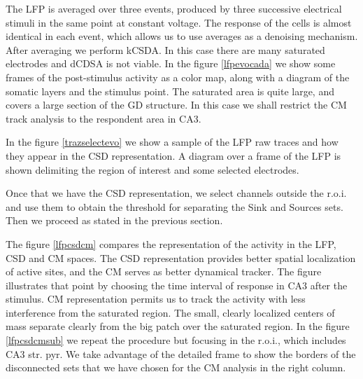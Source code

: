 \documentclass[11pt, letterpaper]{article}
\begin{document}



The LFP is averaged over three events, produced by three successive
electrical stimuli in the same point at constant voltage. The
response of the cells is almost identical in each event, which
allows us to use averages as a denoising mechanism. After averaging
we perform kCSDA. In this case there are
many saturated electrodes and dCDSA is not viable.
In the figure \ref{lfpevocada} we show some frames of the post-stimulus
activity as a color map, along
with a diagram of the somatic layers and the
stimulus point. The saturated area is quite large, and covers
a large section of the GD structure. In this case we shall
restrict the CM track analysis to the respondent area in CA3.

In the figure \ref{trazselectevo} we show a sample of the LFP
raw traces and how they appear in the CSD representation. A diagram
over a frame of the LFP is shown delimiting the region of interest and
some selected electrodes. 

Once that we have the CSD representation, we select channels outside
the r.o.i. and use them to obtain the threshold for separating
the Sink and Sources sets. Then we proceed as stated in the previous section.

The figure \ref{lfpcsdcm}  compares the representation of the activity in
the LFP, CSD and CM spaces. The CSD
representation provides better spatial localization of active sites, and the
CM serves as better dynamical tracker. The figure illustrates
that point by choosing the time interval of response in CA3 after the stimulus.
CM representation permits us to track the activity with less
interference from the saturated region. The small, clearly localized centers of
mass separate clearly from the big patch over the saturated region.
In the figure \ref{lfpcsdcmsub} we repeat the procedure but focusing in
the r.o.i., which includes CA3 str. pyr. We take advantage of the
detailed frame to show the borders of the disconnected sets that
we have chosen for the CM analysis in the right column.
\end{document}
